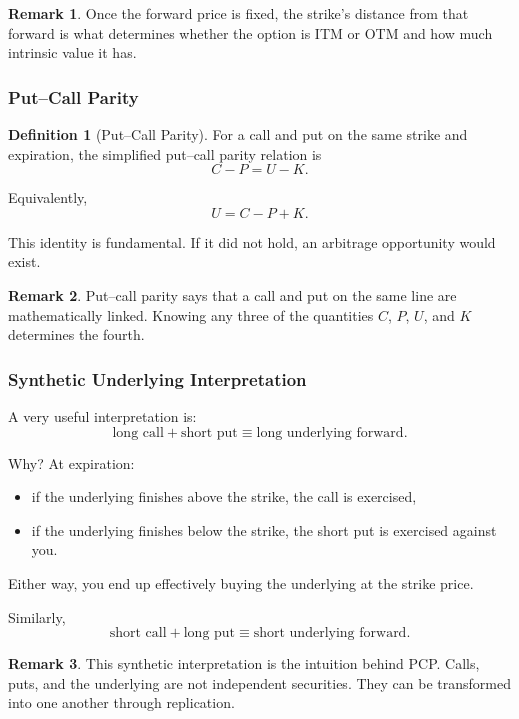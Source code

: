 \documentclass[11pt]{article}
\theoremstyle{definition}
\newtheorem{definition}{Definition}[section]
\newtheorem{remark}{Remark}[section]
\begin{document}
\begin{remark}
Once the forward price is fixed, the strike's distance from that forward is what determines whether the option is ITM or OTM and how much intrinsic value it has.
\end{remark}

\subsubsection{Put--Call Parity}

\begin{definition}[Put--Call Parity]
For a call and put on the same strike and expiration, the simplified put--call parity relation is
\[
C-P=U-K.
\]
\end{definition}

Equivalently,
\[
U=C-P+K.
\]

This identity is fundamental. If it did not hold, an arbitrage opportunity would exist.

\begin{remark}
Put--call parity says that a call and put on the same line are mathematically linked. Knowing any three of the quantities \(C\), \(P\), \(U\), and \(K\) determines the fourth.
\end{remark}

\subsubsection{Synthetic Underlying Interpretation}

A very useful interpretation is:
\[
\text{long call} + \text{short put} \equiv \text{long underlying forward}.
\]

Why? At expiration:
\begin{itemize}[leftmargin=2em]
    \item if the underlying finishes above the strike, the call is exercised,
    \item if the underlying finishes below the strike, the short put is exercised against you.
\end{itemize}

Either way, you end up effectively buying the underlying at the strike price.

Similarly,
\[
\text{short call} + \text{long put} \equiv \text{short underlying forward}.
\]

\begin{remark}
This synthetic interpretation is the intuition behind PCP. Calls, puts, and the underlying are not independent securities. They can be transformed into one another through replication.
\end{remark}
\end{document}
